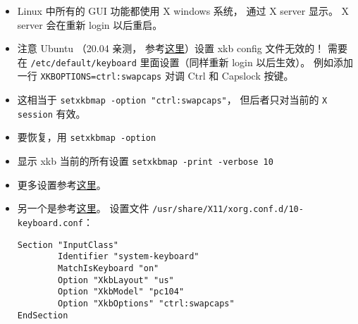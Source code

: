 
\begin{issues}
\issueDraft
\end{issues}

\begin{itemize}
\item Linux 中所有的 GUI 功能都使用 X windows 系统， 通过 X server 显示。 X server 会在重新 login 以后重启。
\item 注意 Ubuntu （20.04 亲测， 参考\href{https://manpages.ubuntu.com/manpages/focal/en/man5/keyboard.5.html}{这里}）设置 xkb config 文件无效的！ 需要在 \verb`/etc/default/keyboard` 里面设置（同样重新 login 以后生效）。 例如添加一行 \verb`XKBOPTIONS=ctrl:swapcaps` 对调 Ctrl 和 Capslock 按键。
\item 这相当于 \verb`setxkbmap -option "ctrl:swapcaps"`， 但后者只对当前的 \verb`X session` 有效。
\item 要恢复，用 \verb`setxkbmap -option`
\item 显示 xkb 当前的所有设置 \verb`setxkbmap -print -verbose 10`
\item 更多设置参考\href{https://gist.github.com/jatcwang/ae3b7019f219b8cdc6798329108c9aee}{这里}。
\item 另一个是参考\href{https://www.linux.com/training-tutorials/hacking-your-linux-keyboard-xkb/}{这里}。 设置文件 \verb`/usr/share/X11/xorg.conf.d/10-keyboard.conf`：
\begin{lstlisting}[language=none]
Section "InputClass"
        Identifier "system-keyboard"
        MatchIsKeyboard "on"
        Option "XkbLayout" "us"
        Option "XkbModel" "pc104"
        Option "XkbOptions" "ctrl:swapcaps"
EndSection
\end{lstlisting}
\end{itemize}
